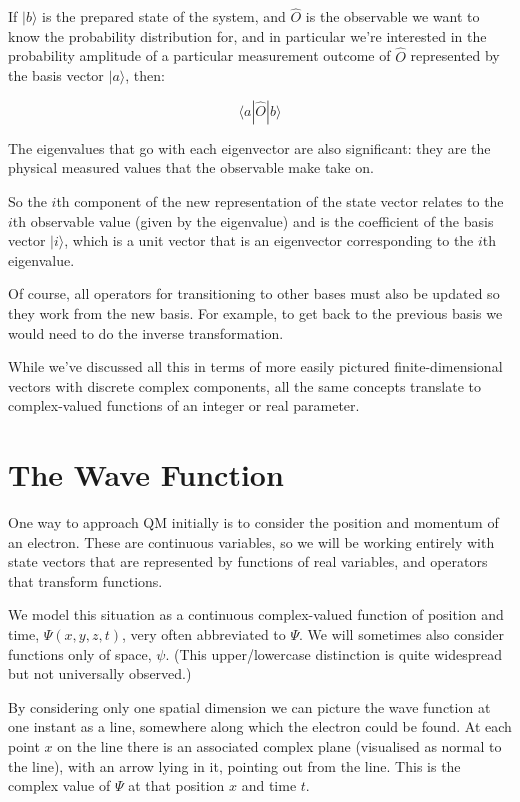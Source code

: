 If $|b \rangle$ is the prepared state of the system, and $\hat{O}$ is the observable we want to know the probability distribution for, and in particular we're interested in the probability amplitude of a particular measurement outcome of $\hat{O}$ represented by the basis vector $|a \rangle$, then:

$$
\langle a | \hat{O} |b \rangle
$$

The eigenvalues that go with each eigenvector are also significant: they are the physical measured values that the observable make take on.

So the $i$th component of the new representation of the state vector relates to the $i$th observable value (given by the eigenvalue) and is the coefficient of the basis vector $|i \rangle$, which is a unit vector that is an eigenvector corresponding to the $i$th eigenvalue.

Of course, all operators for transitioning to other bases must also be updated so they work from the new basis. For example, to get back to the previous basis we would need to do the inverse transformation.

While we've discussed all this in terms of more easily pictured finite-dimensional vectors with discrete complex components, all the same concepts translate to complex-valued functions of an integer or real parameter.

\section{The Wave Function}

One way to approach QM initially is to consider the position and momentum of an electron. These are continuous variables, so we will be working entirely with state vectors that are represented by functions of real variables, and operators that transform functions.

We model this situation as a continuous complex-valued function of position and time, $\Psi(x, y, z, t)$, very often abbreviated to $\Psi$. We will sometimes also consider functions only of space, $\psi$. (This upper/lowercase distinction is quite widespread but not universally observed.)

By considering only one spatial dimension we can picture the wave function at one instant as a line, somewhere along which the electron could be found. At each point $x$ on the line there is an associated complex plane (visualised as normal to the line), with an arrow lying in it, pointing out from the line. This is the complex value of $\Psi$ at that position $x$ and time $t$.

